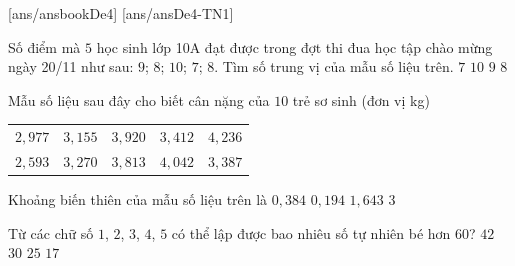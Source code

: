 [ans/ansbookDe4]
\TN
{}[ans/ansDe4-TN1]
\begin{ex}%
Số điểm mà $5$ học sinh lớp 10A đạt được trong đợt thi đua học tập chào mừng ngày 20/11 như sau: $9$; $8$; $10$; $7$; $8$. Tìm số trung vị của mẫu số liệu trên.
\choice
{$7$}
{$10$}
{$9$}
{\True $8$}
\end{ex}

\begin{ex}%
Mẫu số liệu sau đây cho biết cân nặng của $10$ trẻ sơ sinh (đơn vị kg)
\begin{center}
\begin{tabular}{ccccc}
$2{,}977$ & $3{,}155$ & $3{,}920$ & $3{,}412$ & $4{,}236$  \\
$2{,}593$&	$3{,}270$ & $3{,}813$ & $4{,}042$ & $3{,}387$      \\
\end{tabular}
\end{center}
Khoảng biến thiên của mẫu số liệu trên là
\choice
{$0{,}384$}
{$0{,}194$}
{\True $1{,}643$}
{$3$}
\end{ex}

\begin{ex}%
Từ các chữ số $1$, $2$, $3$, $4$, $5$ có thể lập được bao nhiêu số tự nhiên bé hơn $60$?
\choice
{$42$}
{\True $30$}
{$25$}
{$17$}
\end{ex}

